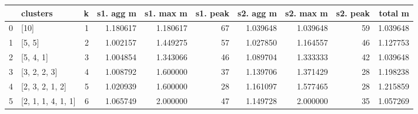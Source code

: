 \begin{tabular}{llrrrrrrrr}
\toprule
{} &            clusters &  k &  s1. agg m &  s1. max m &  s1. peak &  s2. agg m &  s2. max m &  s2. peak &   total m \\
\midrule
0 &                [10] &  1 &   1.180617 &   1.180617 &        67 &   1.039648 &   1.039648 &        59 &  1.039648 \\
1 &              [5, 5] &  2 &   1.002157 &   1.449275 &        57 &   1.027850 &   1.164557 &        46 &  1.127753 \\
2 &           [5, 4, 1] &  3 &   1.004854 &   1.343066 &        46 &   1.089704 &   1.333333 &        42 &  1.039648 \\
3 &        [3, 2, 2, 3] &  4 &   1.008792 &   1.600000 &        37 &   1.139706 &   1.371429 &        28 &  1.198238 \\
4 &     [2, 3, 2, 1, 2] &  5 &   1.020939 &   1.600000 &        28 &   1.161097 &   1.577465 &        28 &  1.215859 \\
5 &  [2, 1, 1, 4, 1, 1] &  6 &   1.065749 &   2.000000 &        47 &   1.149728 &   2.000000 &        35 &  1.057269 \\
\bottomrule
\end{tabular}

